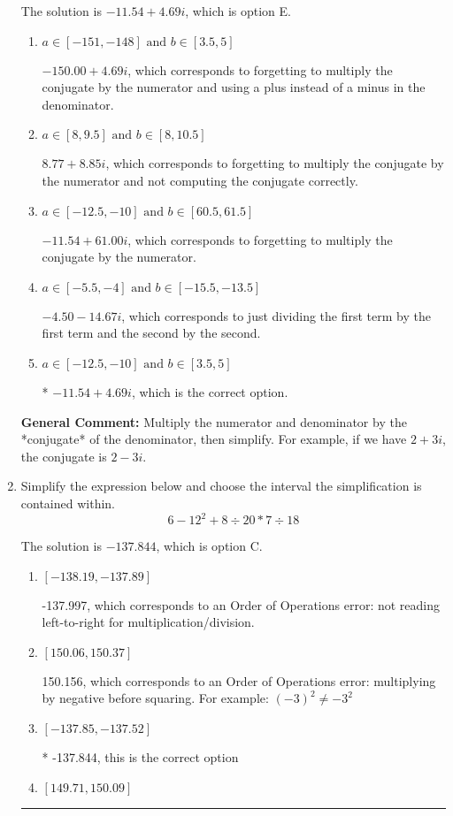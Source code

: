 \documentclass{extbook}[14pt]
\newcommand{\litem}[1]{\item #1

\rule{\textwidth}{0.4pt}}
\begin{document}
\begin{enumerate}
{The solution is \( -11.54  + 4.69 i \), which is option E.\begin{enumerate}[label=\Alph*.]
\item \( a \in [-151, -148] \text{ and } b \in [3.5, 5] \)

 $-150.00  + 4.69 i$, which corresponds to forgetting to multiply the conjugate by the numerator and using a plus instead of a minus in the denominator.
\item \( a \in [8, 9.5] \text{ and } b \in [8, 10.5] \)

 $8.77  + 8.85 i$, which corresponds to forgetting to multiply the conjugate by the numerator and not computing the conjugate correctly.
\item \( a \in [-12.5, -10] \text{ and } b \in [60.5, 61.5] \)

 $-11.54  + 61.00 i$, which corresponds to forgetting to multiply the conjugate by the numerator.
\item \( a \in [-5.5, -4] \text{ and } b \in [-15.5, -13.5] \)

 $-4.50  - 14.67 i$, which corresponds to just dividing the first term by the first term and the second by the second.
\item \( a \in [-12.5, -10] \text{ and } b \in [3.5, 5] \)

* $-11.54  + 4.69 i$, which is the correct option.
\end{enumerate}

\textbf{General Comment:} Multiply the numerator and denominator by the *conjugate* of the denominator, then simplify. For example, if we have $2+3i$, the conjugate is $2-3i$.
}
\litem{
Simplify the expression below and choose the interval the simplification is contained within.
\[ 6 - 12^2 + 8 \div 20 * 7 \div 18 \]

The solution is \( -137.844 \), which is option C.\begin{enumerate}[label=\Alph*.]
\item \( [-138.19, -137.89] \)

 -137.997, which corresponds to an Order of Operations error: not reading left-to-right for multiplication/division.
\item \( [150.06, 150.37] \)

 150.156, which corresponds to an Order of Operations error: multiplying by negative before squaring. For example: $(-3)^2 \neq -3^2$
\item \( [-137.85, -137.52] \)

* -137.844, this is the correct option
\item \( [149.71, 150.09] \)


\end{enumerate}}
\end{enumerate}
\end{document}
